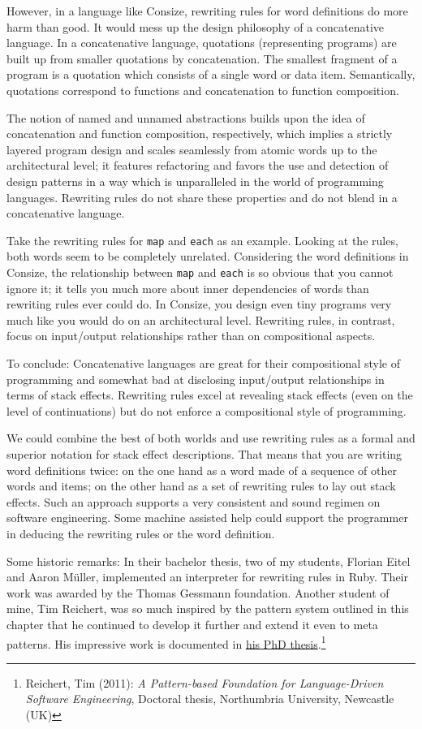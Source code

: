 However, in a language like Consize, rewriting rules for word definitions do more harm than good. It would mess up the design philosophy of a concatenative language. In a concatenative language, quotations (representing programs) are built up from smaller quotations by concatenation. The smallest fragment of a program is a quotation which consists of a single word or data item. Semantically, quotations correspond to functions and concatenation to function composition.

The notion of named and unnamed abstractions builds upon the idea of concatenation and function composition, respectively, which implies a strictly layered program design and scales seamlessly from atomic words up to the architectural level; it features refactoring and favors the use and detection of design patterns in a way which is unparalleled in the world of programming languages. Rewriting rules do not share these properties and do not blend in a concatenative language.

Take the rewriting rules for \verb|map| and \verb|each| as an example. Looking at the rules, both words seem to be completely unrelated. Considering the word definitions in Consize, the relationship between \verb|map| and \verb|each| is so obvious that you cannot ignore it; it tells you much more about inner dependencies of words than rewriting rules ever could do. In Consize, you design even tiny programs very much like you would do on an architectural level. Rewriting rules, in contrast, focus on input\slash output relationships rather than on compositional aspects.

To conclude: Concatenative languages are great for their compositional style of programming and somewhat bad at disclosing input\slash output relationships in terms of stack effects. Rewriting rules excel at revealing stack effects (even on the level of continuations) but do not enforce a compositional style of programming.

We could combine the best of both worlds and use rewriting rules as a formal and superior notation for stack effect descriptions. That means that you are writing word definitions twice: on the one hand as a word made of a sequence of other words and items; on the other hand as a set of rewriting rules to lay out stack effects. Such an approach supports a very consistent and sound regimen on software engineering. Some machine assisted help could support the programmer in deducing the rewriting rules or the word definition.

Some historic remarks: In their bachelor thesis, two of my students, Florian Eitel and Aaron Müller, implemented an interpreter for rewriting rules in Ruby. Their work was awarded by the Thomas Gessmann foundation.
Another student of mine, Tim Reichert, was so much inspired by the pattern system outlined in this chapter that he continued to develop it further and extend it even to meta patterns. His impressive work is documented in \href{http://nrl.northumbria.ac.uk/4385/}{his PhD thesis}.\footnote{Reichert, Tim (2011): \emph{A Pattern-based Foundation for Language-Driven Software Engineering}, Doctoral thesis, Northumbria University, Newcastle (UK)}

